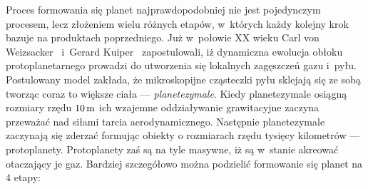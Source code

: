 Proces formowania się planet najprawdopodobniej nie jest pojedynczym procesem,
lecz złożeniem wielu różnych etapów, w~których każdy kolejny krok bazuje na
produktach poprzedniego. Już w~połowie XX wieku Carl von
Weizsacker~\cite*{1943ZA.....22..319W} i~Gerard
Kuiper~\cite*{1951PNAS...37....1K} zapostulowali, iż dynamiczna ewolucja obłoku
protoplanetarnego prowadzi do utworzenia się lokalnych zagęszczeń gazu i~pyłu.
Postulowany model zakłada, że mikroskopijne cząsteczki pyłu sklejają się ze sobą
tworząc coraz to większe ciała --- \emph{planetezymale}. Kiedy planetezymale
osiągną rozmiary rzędu $10\hbox{$\thinspace\textrm{m}$}$ ich wzajemne oddziaływanie grawitacyjne zaczyna
przeważać nad siłami tarcia aerodynamicznego. Następnie planetezymale zaczynają
się zderzać formując obiekty o rozmiarach rzędu tysięcy kilometrów ---
protoplanety. Protoplanety zaś są na tyle masywne, iż są w~stanie akreować
otaczający je gaz. Bardziej szczegółowo można podzielić formowanie się planet na
4 etapy:

